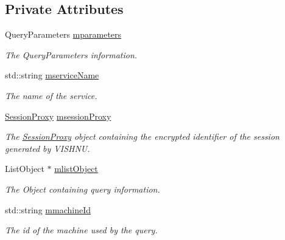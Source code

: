 \subsection*{Private Attributes}
\begin{DoxyCompactItemize}
\item 
\hypertarget{classQueryProxy_a3356a46862004eca747ba5906cd97caf}{
QueryParameters \hyperlink{classQueryProxy_a3356a46862004eca747ba5906cd97caf}{mparameters}}
\label{classQueryProxy_a3356a46862004eca747ba5906cd97caf}

\begin{DoxyCompactList}\small\item\em The QueryParameters information. \item\end{DoxyCompactList}\item 
\hypertarget{classQueryProxy_a143d428a2f44017ffe449870def293d2}{
std::string \hyperlink{classQueryProxy_a143d428a2f44017ffe449870def293d2}{mserviceName}}
\label{classQueryProxy_a143d428a2f44017ffe449870def293d2}

\begin{DoxyCompactList}\small\item\em The name of the service. \item\end{DoxyCompactList}\item 
\hypertarget{classQueryProxy_aab14967c9314295c14e90e7f01c22a78}{
\hyperlink{classSessionProxy}{SessionProxy} \hyperlink{classQueryProxy_aab14967c9314295c14e90e7f01c22a78}{msessionProxy}}
\label{classQueryProxy_aab14967c9314295c14e90e7f01c22a78}

\begin{DoxyCompactList}\small\item\em The \hyperlink{classSessionProxy}{SessionProxy} object containing the encrypted identifier of the session generated by VISHNU. \item\end{DoxyCompactList}\item 
\hypertarget{classQueryProxy_af3dcf0bbbaee6e544e4ab0ce839eaa44}{
ListObject $\ast$ \hyperlink{classQueryProxy_af3dcf0bbbaee6e544e4ab0ce839eaa44}{mlistObject}}
\label{classQueryProxy_af3dcf0bbbaee6e544e4ab0ce839eaa44}

\begin{DoxyCompactList}\small\item\em The Object containing query information. \item\end{DoxyCompactList}\item 
\hypertarget{classQueryProxy_af10336949a511239a1f280cb01e69e1f}{
std::string \hyperlink{classQueryProxy_af10336949a511239a1f280cb01e69e1f}{mmachineId}}
\label{classQueryProxy_af10336949a511239a1f280cb01e69e1f}

\begin{DoxyCompactList}\small\item\em The id of the machine used by the query. \item\end{DoxyCompactList}\end{DoxyCompactItemize}


